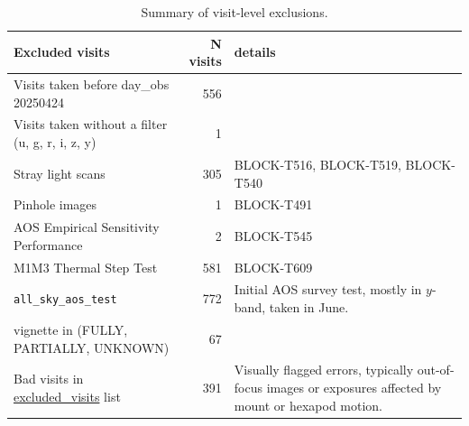\begin{table}
\centering
\caption{Summary of visit-level exclusions.}
\label{tab:dp2-exclusions}

\begin{tabular}{p{8.5cm} r p{5.5cm}}
\hline
\textbf{Excluded visits} &  \textbf{N visits} & \textbf{details} \\
\hline
Visits taken before day\_obs 20250424 & 556 & \\
Visits taken without a filter (u, g, r, i, z, y) & 1 & \\
Stray light scans & 305 & BLOCK-T516, BLOCK-T519, BLOCK-T540  \\
Pinhole images & 1 & BLOCK-T491 \\
AOS Empirical Sensitivity Performance & 2 & BLOCK-T545  \\
M1M3 Thermal Step Test & 581 & BLOCK-T609  \\
\texttt{all\_sky\_aos\_test} & 772 & Initial AOS survey test, mostly in $y$-band, taken in June.\\
vignette in (FULLY, PARTIALLY, UNKNOWN) & 67 & \\
Bad visits in \href{https://github.com/lsst-dm/excluded_visits/blob/main/LSSTCam/bad.ecsv}{excluded\_visits} list
    & 391 & Visually flagged errors, typically out-of-focus images or exposures affected by mount or hexapod motion.\\

\hline
\end{tabular}
\end{table}

